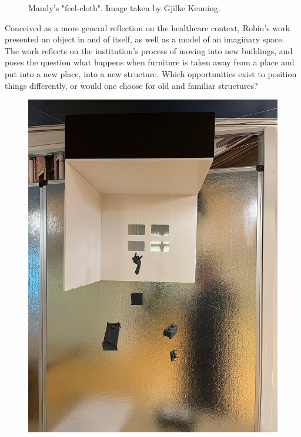 \documentclass[authordate, empirical,issue]{jote-new-article}
\begin{document}
{\begin{figure}
		\caption{Mandy's "feel-cloth". Image taken by Gjilke Keuning.}



	\end{figure}













	Conceived as a more general reflection on the healthcare context, Robin's work presented an object in and of itself, as well as a model of an imaginary space. The work reflects on the institution's process of moving into new buildings, and poses the question what happens when furniture is taken away from a place and put into a new place, into a new structure. Which opportunities exist to position things differently, or would one choose for old and familiar structures?







	\begin{figure}
		\includegraphics[width=\linewidth]{media/fig4.jpeg}


\end{figure}}
\end{document}
